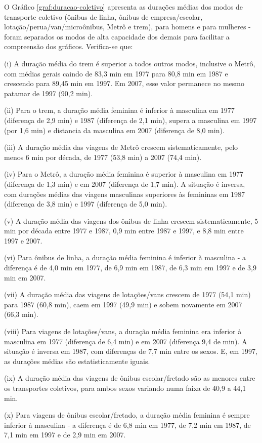 O Gráfico \ref{graf:duracao-coletivo} apresenta as durações médias dos modos de transporte coletivo (ônibus de linha, ônibus de empresa/escolar, lotação/perua/van/microônibus, Metrô e trem), para homens e para mulheres - foram separados os modos de alta capacidade dos demais para facilitar a compreensão dos gráficos. Verifica-se que:
\begin{compactitem}[]
\item (i) A duração média do trem é superior a todos outros modos, inclusive o Metrô, com médias gerais caindo de 83,3 min em 1977 para 80,8 min em 1987 e crescendo para 89,45 min em 1997. Em 2007, esse valor permanece no mesmo patamar de 1997 (90,2 min).
\item (ii) Para o trem, a duração média feminina é inferior à masculina em 1977 (diferença de 2,9 min) e 1987 (diferença de 2,1 min), supera a masculina em 1997 (por 1,6 min) e distancia da masculina em 2007 (diferença de 8,0 min).
\item (iii) A duração média das viagens de Metrô crescem sistematicamente, pelo menos 6 min por década, de 1977 (53,8 min) a 2007 (74,4 min).
\item (iv) Para o Metrô, a duração média feminina é superior à masculina em 1977 (diferença de 1,3 min) e em 2007 (diferença de 1,7 min). A situação é inversa, com durações médias das viagens masculinas superiores às femininas em 1987 (diferença de 3,8 min) e 1997 (diferença de 5,0 min).
\item (v) A duração média das viagens dos ônibus de linha crescem sistematicamente, 5 min por década entre 1977 e 1987, 0,9 min entre 1987 e 1997, e 8,8 min entre 1997 e 2007.
\item (vi) Para ônibus de linha, a duração média feminina é inferior à masculina - a diferença é de 4,0 min em 1977, de 6,9 min em 1987, de 6,3 min em 1997 e de 3,9 min em 2007.
\item (vii) A duração média das viagens de lotações/vans crescem de 1977 (54,1 min) para 1987 (60,8 min), caem em 1997 (49,9 min) e sobem novamente em 2007 (66,3 min).
\item (viii) Para viagens de lotações/vans, a duração média feminina era inferior à masculina em 1977 (diferença de 6,4 min) e em 2007 (diferença 9,4 de min). A situação é inversa em 1987, com diferenças de 7,7 min entre os sexos. E, em 1997, as durações médias são estatisticamente iguais.
\item (ix) A duração média das viagens de ônibus escolar/fretado são as menores entre os transportes coletivos, para ambos sexos variando numa faixa de 40,9 a 44,1 min.
\item (x) Para viagens de ônibus escolar/fretado, a duração média feminina é sempre inferior à masculina - a diferença é de 6,8 min em 1977, de 7,2 min em 1987, de 7,1 min em 1997 e de 2,9 min em 2007.
\end{compactitem}

